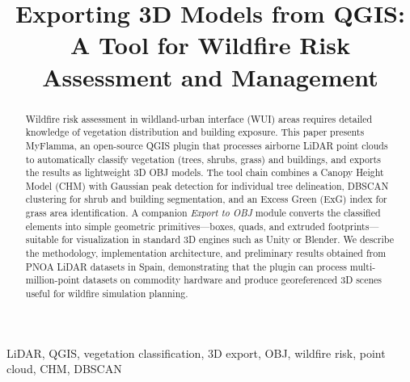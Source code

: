 \documentclass[conference]{IEEEtran}
\begin{document}
\title{Exporting 3D Models from QGIS: A Tool for Wildfire Risk Assessment and Management}

\author{
}

\maketitle

\begin{abstract}
Wildfire risk assessment in wildland-urban interface (WUI) areas requires detailed knowledge of vegetation distribution and building exposure. This paper presents MyFlamma, an open-source QGIS plugin that processes airborne LiDAR point clouds to automatically classify vegetation (trees, shrubs, grass) and buildings, and exports the results as lightweight 3D OBJ models. The tool chain combines a Canopy Height Model (CHM) with Gaussian peak detection for individual tree delineation, DBSCAN clustering for shrub and building segmentation, and an Excess Green (ExG) index for grass area identification. A companion \textit{Export to OBJ} module converts the classified elements into simple geometric primitives---boxes, quads, and extruded footprints---suitable for visualization in standard 3D engines such as Unity or Blender. We describe the methodology, implementation architecture, and preliminary results obtained from PNOA LiDAR datasets in Spain, demonstrating that the plugin can process multi-million-point datasets on commodity hardware and produce georeferenced 3D scenes useful for wildfire simulation planning.
\end{abstract}


\begin{IEEEkeywords}
LiDAR, QGIS, vegetation classification, 3D export, OBJ, wildfire risk, point cloud, CHM, DBSCAN
\end{IEEEkeywords}









\end{document}
